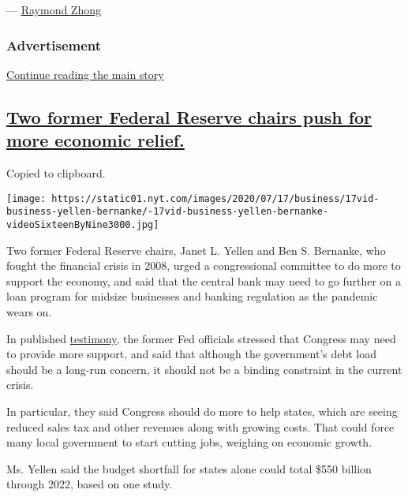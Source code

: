 --- \href{https://www.nytimes.com/by/raymond-zhong}{Raymond Zhong}

\hypertarget{advertisement-1}{%
\subsubsection{Advertisement}\label{advertisement-1}}

\protect\hyperlink{after-dfp-ad-mid2}{Continue reading the main story}

\hypertarget{two-former-federal-reserve-chairs-push-for-more-economic-relief}{%
\subsection{\texorpdfstring{\protect\hyperlink{two-former-federal-reserve-chairs-push-for-more-economic-relief}{Two
former Federal Reserve chairs push for more economic
relief.}}{Two former Federal Reserve chairs push for more economic relief.}}\label{two-former-federal-reserve-chairs-push-for-more-economic-relief}}

Copied to clipboard.

\texttt{[image: https://static01.nyt.com/images/2020/07/17/business/17vid-business-yellen-bernanke/-17vid-business-yellen-bernanke-videoSixteenByNine3000.jpg]}

Two former Federal Reserve chairs, Janet L. Yellen and Ben S. Bernanke,
who fought the financial crisis in 2008, urged a congressional committee
to do more to support the economy, and said that the central bank may
need to go further on a loan program for midsize businesses and banking
regulation as the pandemic wears on.

In published
\href{https://www.brookings.edu/blog/up-front/2020/07/16/former-fed-chairs-bernanke-and-yellen-testified-on-covid-19-and-response-to-economic-crisis/}{testimony},
the former Fed officials stressed that Congress may need to provide more
support, and said that although the government's debt load should be a
long-run concern, it should not be a binding constraint in the current
crisis.

In particular, they said Congress should do more to help states, which
are seeing reduced sales tax and other revenues along with growing
costs. That could force many local government to start cutting jobs,
weighing on economic growth.

Ms. Yellen said the budget shortfall for states alone could total \$550
billion through 2022, based on one study.

